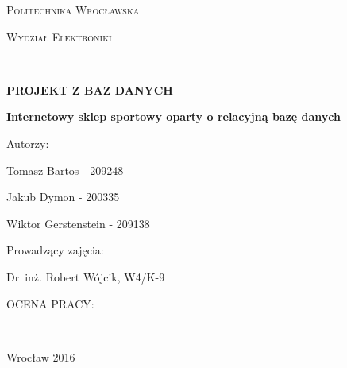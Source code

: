 \documentclass[a4paper, 12pt]{article}
\begin{document}
\begin{titlepage}
	\centering
	{\scshape\LARGE Politechnika Wrocławska \par}
	\vspace{0.2cm}
	{\scshape\Large Wydział Elektroniki\par}
	\noindent\hrulefill\\
	\vspace{2cm}
	{\huge\bfseries PROJEKT Z BAZ DANYCH\par}
	\vspace{1.5cm}
	{\LARGE\bfseries Internetowy sklep sportowy oparty o relacyjną bazę danych\par}
	\vspace{2cm}

\begin{minipage}{0.4\textwidth}
\begin{flushleft}
	{\large Autorzy:\par}
	{Tomasz Bartos - 209248\par}
	{Jakub Dymon - 200335\par}
	{Wiktor Gerstenstein - 209138\par}
\end{flushleft}
\end{minipage}
\begin{minipage}{0.55\textwidth}
\begin{flushright}
{\large Prowadzący zajęcia:\ \ \ \ \ \ \ \ \ \ \par}
{Dr~inż. Robert Wójcik, W4/K-9\par}
\end{flushright}
\end{minipage}

\vspace{2cm}

\begin{minipage}{0.6\textwidth}
\begin{flushright}
{OCENA PRACY:}
\end{flushright}
\end{minipage}
	
\vfill
\noindent\hrulefill\\
{\large Wrocław 2016\par}
\end{titlepage}

\tableofcontents
\cleardoublepage

\setcounter{page}{1}

\listoffigures
{}
\cleardoublepage
\end{document}
